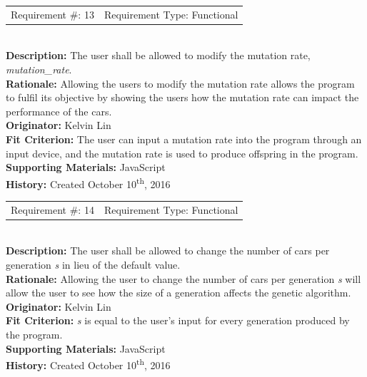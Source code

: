 \documentclass[12pt, titlepage]{article}
\begin{document}
\begin{reqbox}
%
\begin{tabular}{cc}
Requirement \#: 13 & Requirement Type: Functional \\
\end{tabular} \\
%
\textbf{Description:} The user shall be allowed to modify the mutation rate, 
\textit{mutation\_rate}. \\
\textbf{Rationale:} Allowing the users to modify the mutation rate allows the 
program to fulfil its objective by showing the users how the mutation rate can 
impact the performance of the cars. \\
\textbf{Originator:} Kelvin Lin\\
\textbf{Fit Criterion:} The user can input a mutation rate into the program 
through an input device, and the mutation rate is used to produce offspring in 
the program.\\
%  
\textbf{Supporting Materials:} JavaScript \\
\textbf{History:} Created October 10\textsuperscript{th}, 2016
%
\end{reqbox}

\begin{reqbox}
%
\begin{tabular}{cc}
Requirement \#: 14 & Requirement Type: Functional \\
\end{tabular} \\
%
\textbf{Description:} The user shall be allowed to change the number of cars per 
generation \textit{s} in lieu of the default value. \\
\textbf{Rationale:} Allowing the user to change the number of cars per 
generation \textit{s} will allow the user to see how the size of a generation 
affects the genetic algorithm. \\
\textbf{Originator:} Kelvin Lin\\
\textbf{Fit Criterion:} \textit{s} is equal to the user's input for every 
generation produced by the program.\\
%  
\textbf{Supporting Materials:} JavaScript \\
\textbf{History:} Created October 10\textsuperscript{th}, 2016
%
\end{reqbox}

\newpage
\end{document}
